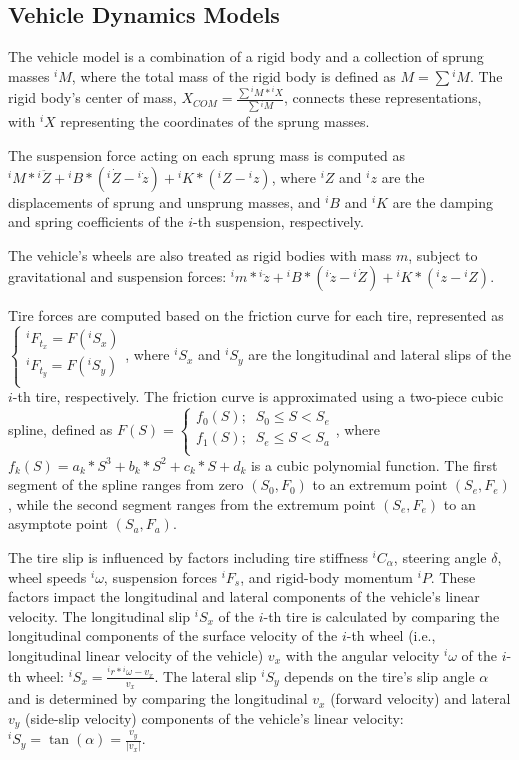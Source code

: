 \documentclass[letterpaper, 10 pt, conference]{ieeeconf}  %
\begin{document}
	\subsection{Vehicle Dynamics Models}
	\label{Sub-Section: Vehicle Dynamics Models}
	
	The vehicle model is a combination of a rigid body and a collection of sprung masses $^iM$, where the total mass of the rigid body is defined as $M=\sum{^iM}$. The rigid body's center of mass, $X_{COM} = \frac{\sum{{^iM}*{^iX}}}{\sum{^iM}}$, connects these representations, with $^iX$ representing the coordinates of the sprung masses.
	
	The suspension force acting on each sprung mass is computed as ${^iM} * {^i{\ddot{Z}}} + {^iB} * ({^i{\dot{Z}}}-{^i{\dot{z}}}) + {^iK} * ({^i{Z}}-{^i{z}})$, where $^iZ$ and $^iz$ are the displacements of sprung and unsprung masses, and $^iB$ and $^iK$ are the damping and spring coefficients of the $i$-th suspension, respectively.
	
	The vehicle's wheels are also treated as rigid bodies with mass $m$, subject to gravitational and suspension forces: ${^im} * {^i{\ddot{z}}} + {^iB} * ({^i{\dot{z}}}-{^i{\dot{Z}}}) + {^iK} * ({^i{z}}-{^i{Z}})$.
	
	Tire forces are computed based on the friction curve for each tire, represented as $\left\{\begin{matrix} {^iF_{t_x}} = F(^iS_x) \\{^iF_{t_y}} = F(^iS_y) \\ \end{matrix}\right.$, where $^iS_x$ and $^iS_y$ are the longitudinal and lateral slips of the $i$-th tire, respectively. The friction curve is approximated using a two-piece cubic spline, defined as $F(S) = \left\{\begin{matrix} f_0(S); \;\; S_0 \leq S < S_e \\ f_1(S); \;\; S_e \leq S < S_a \\ \end{matrix}\right.$, where $f_k(S) = a_k*S^3+b_k*S^2+c_k*S+d_k$ is a cubic polynomial function. The first segment of the spline ranges from zero $(S_0,F_0)$ to an extremum point $(S_e,F_e)$, while the second segment ranges from the extremum point $(S_e, F_e)$ to an asymptote point $(S_a, F_a)$.
	
	The tire slip is influenced by factors including tire stiffness $^iC_\alpha$, steering angle $\delta$, wheel speeds $^i\omega$, suspension forces $^iF_s$, and rigid-body momentum $^iP$. These factors impact the longitudinal and lateral components of the vehicle's linear velocity. The longitudinal slip $^iS_x$ of the $i$-th tire is calculated by comparing the longitudinal components of the surface velocity of the $i$-th wheel (i.e., longitudinal linear velocity of the vehicle) $v_x$ with the angular velocity $^i\omega$ of the $i$-th wheel: ${^iS_x} = \frac{{^ir}*{^i\omega}-v_x}{v_x}$. The lateral slip $^iS_y$ depends on the tire's slip angle $\alpha$ and is determined by comparing the longitudinal $v_x$ (forward velocity) and lateral $v_y$ (side-slip velocity) components of the vehicle's linear velocity: ${^iS_y} = \tan(\alpha) = \frac{v_y}{\left| v_x \right|}$.
	
\end{document}
